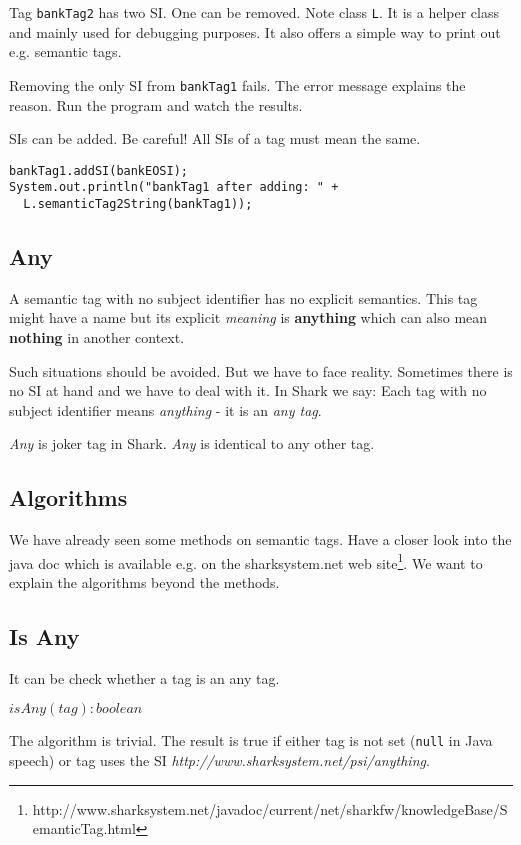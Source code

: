 Tag {\tt bankTag2} has two SI. One can be removed. Note class {\tt L}.
It is a helper class and mainly used for debugging purposes. It also
offers a simple way to print out e.g. semantic tags.

Removing the only SI from  {\tt bankTag1} fails. The error message explains the
reason. Run the program and watch the results.

SIs can be added. Be careful! All SIs of a tag must mean the same.

\begin{verbatim}
bankTag1.addSI(bankEOSI);
System.out.println("bankTag1 after adding: " + 
  L.semanticTag2String(bankTag1));
\end{verbatim}

\subsection{Any}
\label{sec:AnyST}
A semantic tag with no subject identifier has no explicit semantics. This tag might have a name but its explicit {\it meaning} is {\bf anything} which can also mean {\bf nothing} in another context.

Such situations should be avoided. But we have to face reality. Sometimes there
is no SI at hand and we have to deal with it. In Shark we say: Each tag with no subject identifier means {\it anything} - it is an {\it any tag}.

{\it Any} is joker tag in Shark. {\it Any} is identical to any other tag.

\subsection{Algorithms}
We have already seen some methods on semantic tags. Have a closer look into the java doc which is available e.g. on the sharksystem.net web 
site\footnote{http://www.sharksystem.net/javadoc/current/net/sharkfw/knowledgeBase/SemanticTag.html}. 
We want to explain the algorithms beyond the methods.

\subsection{Is Any}
It can be check whether a tag is an any tag.

$isAny(tag): boolean$

The algorithm is trivial. The result is true if either tag is not set ({\tt null} in Java speech) or tag uses the SI {\it http://www.sharksystem.net/psi/anything}.

